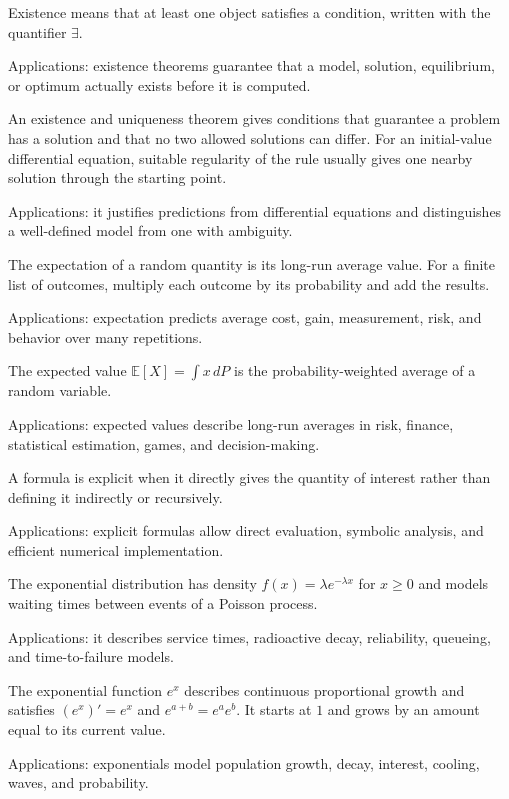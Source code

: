 Existence means that at least one object satisfies a condition, written with the quantifier $\exists$. \par\noindent Applications: existence theorems guarantee that a model, solution, equilibrium, or optimum actually exists before it is computed.

An existence and uniqueness theorem gives conditions that guarantee a problem has a solution and that no two allowed solutions can differ. For an initial-value differential equation, suitable regularity of the rule usually gives one nearby solution through the starting point. \par\noindent Applications: it justifies predictions from differential equations and distinguishes a well-defined model from one with ambiguity.

The expectation of a random quantity is its long-run average value. For a finite list of outcomes, multiply each outcome by its probability and add the results. \par\noindent Applications: expectation predicts average cost, gain, measurement, risk, and behavior over many repetitions.

The expected value $\mathbb E[X]=\int x\,dP$ is the probability-weighted average of a random variable. \par\noindent Applications: expected values describe long-run averages in risk, finance, statistical estimation, games, and decision-making.

A formula is explicit when it directly gives the quantity of interest rather than defining it indirectly or recursively. \par\noindent Applications: explicit formulas allow direct evaluation, symbolic analysis, and efficient numerical implementation.

The exponential distribution has density $f(x)=\lambda e^{-\lambda x}$ for $x\ge0$ and models waiting times between events of a Poisson process. \par\noindent Applications: it describes service times, radioactive decay, reliability, queueing, and time-to-failure models.

The exponential function $e^x$ describes continuous proportional growth and satisfies $(e^x)'=e^x$ and $e^{a+b}=e^ae^b$. It starts at $1$ and grows by an amount equal to its current value. \par\noindent Applications: exponentials model population growth, decay, interest, cooling, waves, and probability.


